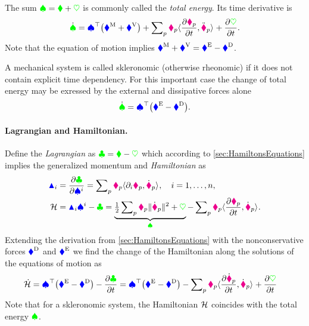 The sum $\totalEnergy = \kineticEnergy + \potentialEnergy$ is commonly called the \textit{total energy}.
Its time derivative is
\begin{align}
 \dot{\totalEnergy} = \sysVel^\top \big( \genForceInertia + \genForcePotential \big) + \sumParticles \particleMass{\PidxI} \sProd{\pdiff[\particlePos{\PidxI}]{t}}{\particlePosdd{\PidxI}} + \pdiff[\potentialEnergy]{t}
 .
\end{align}
Note that the equation of motion implies $\genForceInertia + \genForcePotential = \genForceEx - \genForceDiss$.

A mechanical system is called skleronomic (otherwise rheonomic) if it does not contain explicit time dependency. 
For this important case the change of total energy may be exressed by the external and dissipative forces alone
\begin{align}
 \dot{\totalEnergy} = \sysVel^\top \big( \genForceEx - \genForceDiss \big) %
 .
\end{align}

\paragraph{Lagrangian and Hamiltonian.}
Define the \textit{Lagrangian} as $\Lagrangian = \kineticEnergy - \potentialEnergy$ which according to \autoref{sec:HamiltonsEquations} implies the generalized momentum and \textit{Hamiltonian} as
\begin{align}
 \genMomentumCoeff{\LidxI} &= \pdiff[\Lagrangian]{\sysVelCoeff{\LidxI}} = \sumParticles \particleMass{\PidxI} \sProd{\dirDiff{\LidxI} \particlePos{\PidxI}}{\particlePosd{\PidxI}}, \quad \LidxI = 1,\ldots,\dimConfigSpace,
\\
 \Hamiltonian &= \genMomentumCoeff{\LidxI} \sysVelCoeff{\LidxI} - \Lagrangian = \underbrace{\tfrac{1}{2} \sumParticles \particleMass{\PidxI} \norm{\particlePosd{\PidxI}}^2 + \potentialEnergy}_{\totalEnergy} - \sumParticles \particleMass{\PidxI} \sProd{\pdiff[\particlePos{\PidxI}]{t}}{\particlePosd{\PidxI}} 
 .
\end{align}
Extending the derivation from \autoref{sec:HamiltonsEquations} with the nonconservative forces $\genForceDiss$ and $\genForceEx$ we find the change of the Hamiltonian along the solutions of the equations of motion as
\begin{align}
 \dot{\Hamiltonian} &=  \sysVel^\top \big( \genForceEx - \genForceDiss \big) - \pdiff[\Lagrangian]{t}
 = \sysVel^\top \big( \genForceEx - \genForceDiss \big) - \sumParticles \particleMass{\PidxI} \sProd{\pdiff[\particlePosd{\PidxI}]{t}}{\particlePosd{\PidxI}} + \pdiff[\potentialEnergy]{t}
\end{align}
Note that for a skleronomic system, the Hamiltonian $\Hamiltonian$ coincides with the total energy $\totalEnergy$. 

